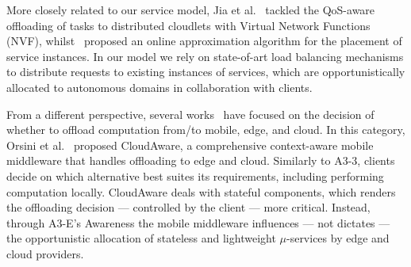 More closely related to our service model, Jia et al.~\cite{Jia:2017} tackled the QoS-aware offloading of tasks to distributed cloudlets with Virtual Network Functions (NVF), whilst~\cite{Wang:2017b} proposed an online approximation algorithm for the placement of service instances. In our model we rely on state-of-art load balancing mechanisms to distribute requests to existing instances of services, which are opportunistically allocated to autonomous domains in collaboration with clients.

From a different perspective, several works~\cite{ZhaoZGZN15, Liu:2016, OrsiniBL16, Xu:2018} have focused on the decision of whether to offload computation from/to mobile, edge, and cloud. 
In this category, Orsini et al.~\cite{OrsiniBL16} proposed CloudAware, a comprehensive context-aware mobile middleware that handles offloading to edge and cloud. Similarly to A3-3, clients decide on which alternative best suites its requirements, including performing computation locally. CloudAware deals with stateful components, which renders the offloading decision --- controlled by the client --- more critical. Instead, through A3-E's Awareness the mobile middleware influences --- not dictates --- the opportunistic allocation of stateless and lightweight $\mu$-services by edge and cloud providers. 



